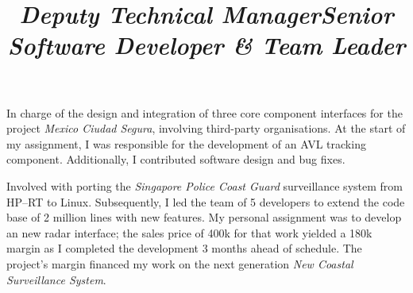 \documentclass[overlapped,line,letterpaper]{res}
\begin{document}
\begin{resume}
  \title{\em Deputy Technical Manager}
  \begin{position}
    In charge of the design and integration of three core component interfaces
    for the project {\em Mexico Ciudad Segura}, involving third-party
    organisations. At the start of my assignment, I was responsible for the
    development of an AVL tracking component. Additionally, I contributed
    software design and bug fixes.
  \end{position}

  \newpage
  
  \title{\em Senior Software Developer \& Team Leader}
  \begin{position}
    Involved with porting the {\em Singapore Police Coast Guard} surveillance
    system from HP--RT to Linux. Subsequently, I led the team of 5 developers to
    extend the code base of 2 million lines with new features. My
    personal assignment was to develop an new radar interface; the sales price
    of 400k for that work yielded a 180k margin as I completed the development 3
    months ahead of schedule. The project's margin financed my work on the
    next generation {\em New Coastal Surveillance System}.
  \end{position}









\end{resume}
\end{document}
